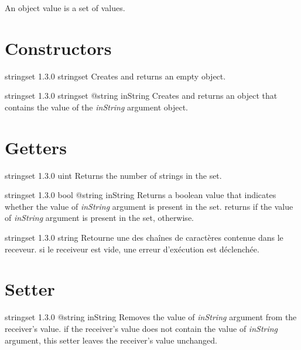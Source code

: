 

An  object value is a set of  values.\\

\section{Constructors}

{stringset}
{1.3.0}
{stringset}
{Creates and returns an empty  object.}
{}

{stringset}
{1.3.0}
{stringset}
{@string inString}
{Creates and returns an  object that contains the value of the \emph{inString} argument object.}
{}

\section{Getters}

{stringset}
{1.3.0}
{uint}
{Returns the number of strings in the set.}
{}



{stringset}
{1.3.0}
{bool}
{@string inString}
{Returns a boolean value that indicates whether the value of \emph{inString} argument is present in the set.}
{returns  if the value of \emph{inString} argument is present in the set,  otherwise.}


{stringset}
{1.3.0}
{string}
{Retourne une des chaînes de caractères contenue dans le receveur.}
{si le receiveur est vide, une erreur d'exécution est déclenchée.}




\section{Setter}

{stringset}
{1.3.0}
{@string inString}
{Removes the value of \emph{inString} argument from the receiver's value.}
{if the receiver's value does not contain the value of \emph{inString} argument, this setter leaves the receiver's value unchanged.}






